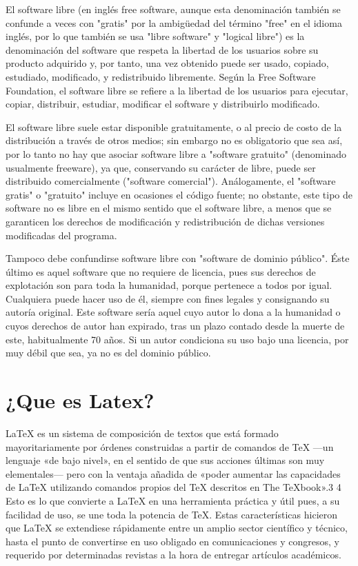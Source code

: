 \documentclass[12pt,a4paper]{report}
\begin{document}
El software libre (en inglés free software, aunque esta denominación también se confunde a veces con "gratis" por la ambigüedad del término "free" en el idioma inglés, por lo que también se usa "libre software" y "logical libre") es la denominación del software que respeta la libertad de los usuarios sobre su producto adquirido y, por tanto, una vez obtenido puede ser usado, copiado, estudiado, modificado, y redistribuido libremente. Según la Free Software Foundation, el software libre se refiere a la libertad de los usuarios para ejecutar, copiar, distribuir, estudiar, modificar el software y distribuirlo modificado.

El software libre suele estar disponible gratuitamente, o al precio de costo de la distribución a través de otros medios; sin embargo no es obligatorio que sea así, por lo tanto no hay que asociar software libre a "software gratuito" (denominado usualmente freeware), ya que, conservando su carácter de libre, puede ser distribuido comercialmente ("software comercial"). Análogamente, el "software gratis" o "gratuito" incluye en ocasiones el código fuente; no obstante, este tipo de software no es libre en el mismo sentido que el software libre, a menos que se garanticen los derechos de modificación y redistribución de dichas versiones modificadas del programa.

Tampoco debe confundirse software libre con "software de dominio público". Éste último es aquel software que no requiere de licencia, pues sus derechos de explotación son para toda la humanidad, porque pertenece a todos por igual. Cualquiera puede hacer uso de él, siempre con fines legales y consignando su autoría original. Este software sería aquel cuyo autor lo dona a la humanidad o cuyos derechos de autor han expirado, tras un plazo contado desde la muerte de este, habitualmente 70 años. Si un autor condiciona su uso bajo una licencia, por muy débil que sea, ya no es del dominio público.

\section{¿Que es Latex?}
LaTeX es un sistema de composición de textos que está formado mayoritariamente por órdenes construidas a partir de comandos de TeX —un lenguaje «de bajo nivel», en el sentido de que sus acciones últimas son muy elementales— pero con la ventaja añadida de «poder aumentar las capacidades de LaTeX utilizando comandos propios del TeX descritos en The TeXbook».3 4 Esto es lo que convierte a LaTeX en una herramienta práctica y útil pues, a su facilidad de uso, se une toda la potencia de TeX. Estas características hicieron que LaTeX se extendiese rápidamente entre un amplio sector científico y técnico, hasta el punto de convertirse en uso obligado en comunicaciones y congresos, y requerido por determinadas revistas a la hora de entregar artículos académicos.
\end{document}
